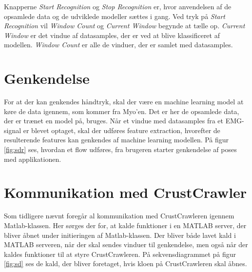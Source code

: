 Knapperne \textit{Start Recognition} og \textit{Stop Recognition} er, hvor anvendelsen af de opsamlede data og de udviklede modeller sættes i gang. Ved tryk på \textit{Start Recognition} vil \textit{Window Count} og \textit{Current Window} begynde at tælle op. \textit{Current Window} er det vindue af datasamples, der er ved at blive klassificeret af modellen. \textit{Window Count} er alle de vinduer, der er samlet med datasamples.

\section{Genkendelse}
For at der kan genkendes håndtryk, skal der være en machine learning model at køre de data igennem, som kommer fra Myo'en. Det er her de opsamlede data, der er trænet en model på, bruges. Når et vindue med datasamples fra et EMG-signal er blevet optaget, skal der udføres feature extraction, hvorefter de resulterende features kan genkendes af machine learning modellen. På figur \ref{fig:sdr} ses, hvordan et flow udføres, fra brugeren starter genkendelse af poses med applikationen.



\section{Kommunikation med CrustCrawler}
\label{sec:ktc}
Som tidligere nævnt foregår al kommunikation med CrustCrawleren igennem Matlab-klassen. Her sørges der for, at kalde funktioner i en MATLAB server, der bliver åbnet under initieringen af Matlab-klassen. Der bliver både lavet kald i MATLAB serveren, når der skal sendes vinduer til genkendelse, men også når der kaldes funktioner til at styre CrustCrawleren. På sekvensdiagrammet på figur \ref{fig:sd} ses de kald, der bliver foretaget, hvis kloen på CrustCrawleren skal åbnes.

